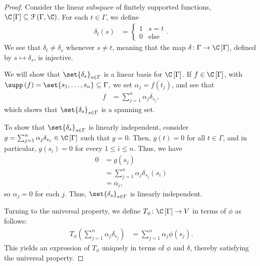 \begin{proof}
  Consider the linear subspace of finitely supported functions, $\C\left[\Gamma\right]\subseteq \mathcal{F}\left(\Gamma,\C\right)$. For each $t\in \Gamma$, we define
  \begin{align*}
    \delta_t\left(s\right) &= \begin{cases}
      1 & s=t\\
      0 & \text{else}
    \end{cases}.
  \end{align*}
    We see that $\delta_t\neq \delta_s$ whenever $s\neq t$, meaning that the map $\delta\colon \Gamma\rightarrow \C\left[\Gamma\right]$, defined by $s \mapsto \delta_s$, is injective.\newline

    We will show that $\set{\delta_s}_{s\in \Gamma}$ is a linear basis for $\C\left[\Gamma\right]$. If $f\in \C\left[\Gamma\right]$, with $\supp\left(f\right) = \set{s_1,\dots,s_n}\subseteq \Gamma$, we set $\alpha_j = f\left(t_j\right)$, and see that
    \begin{align*}
      f &= \sum_{j=1}^{n}\alpha_j\delta_{s_j},
    \end{align*}
    which shows that $\set{\delta_s}_{s\in\Gamma}$ is a spanning set.\newline

    To show that $\set{\delta_s}_{s\in\Gamma}$ is linearly independent, consider $g = \sum_{j=1}^{n}\alpha_j\delta_{s_j}\in \C\left[\Gamma\right]$ such that $g = 0$. Then, $g(t) = 0$ for all $t\in\Gamma$, and in particular, $g\left(s_i\right) = 0$ for every $1 \leq i \leq n$. Thus, we have
    \begin{align*}
      0 &= g\left(s_j\right)\\
        &= \sum_{j=1}^{n}\alpha_j\delta_{s_j}\left(s_i\right)\\
        &= \alpha_i,
    \end{align*}
    so $\alpha_j = 0$ for each $j$. Thus, $\set{\delta_s}_{s\in \Gamma}$ is linearly independent.\newline

    Turning to the universal property, we define $T_{\phi}\colon \C\left[\Gamma\right]\rightarrow V$ in terms of $\phi$ as follows:
    \begin{align*}
      T_{\phi}\left(\sum_{j=1}^{n}\alpha_j\delta_{s_j}\right) &= \sum_{j=1}^{n}\alpha_j\phi\left(s_j\right).
    \end{align*}
    This yields an expression of $T_{\phi}$ uniquely in terms of $\phi$ and $\delta$, thereby satisfying the universal property.
\end{proof}
